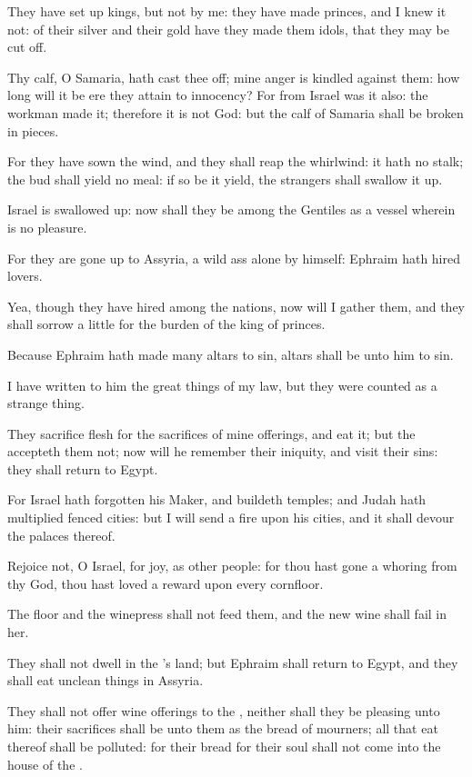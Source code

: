 \Verse They have set up kings, but not by me: they have made princes, and I knew it not: of their silver and their gold have they made them idols, that they may be cut off.

\Verse Thy calf, O Samaria, hath cast thee off; mine anger is kindled against them: how long will it be ere they attain to innocency?  \Verse For from Israel was it also: the workman made it; therefore it is not God: but the calf of Samaria shall be broken in pieces.

\Verse For they have sown the wind, and they shall reap the whirlwind: it hath no stalk; the bud shall yield no meal: if so be it yield, the strangers shall swallow it up.

\Verse Israel is swallowed up: now shall they be among the Gentiles as a vessel wherein is no pleasure.

\Verse For they are gone up to Assyria, a wild ass alone by himself: Ephraim hath hired lovers.

\Verse Yea, though they have hired among the nations, now will I gather them, and they shall sorrow a little for the burden of the king of princes.

\Verse Because Ephraim hath made many altars to sin, altars shall be unto him to sin.

\Verse I have written to him the great things of my law, but they were counted as a strange thing.

\Verse They sacrifice flesh for the sacrifices of mine offerings, and eat it; but the \LORD accepteth them not; now will he remember their iniquity, and visit their sins: they shall return to Egypt.

\Verse For Israel hath forgotten his Maker, and buildeth temples; and Judah hath multiplied fenced cities: but I will send a fire upon his cities, and it shall devour the palaces thereof.


\Chapter
\Verse Rejoice not, O Israel, for joy, as other people: for thou hast gone a whoring from thy God, thou hast loved a reward upon every cornfloor.

\Verse The floor and the winepress shall not feed them, and the new wine shall fail in her.

\Verse They shall not dwell in the \LORD's land; but Ephraim shall return to Egypt, and they shall eat unclean things in Assyria.

\Verse They shall not offer wine offerings to the \LORD, neither shall they be pleasing unto him: their sacrifices shall be unto them as the bread of mourners; all that eat thereof shall be polluted: for their bread for their soul shall not come into the house of the \LORD.

